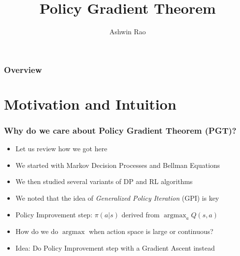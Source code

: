 \documentclass{beamer}
\title[Policy Gradient Theorem]{Policy Gradient Theorem} %
\author{Ashwin Rao} %
\institute[Stanford] %
{ICME, Stanford University
}
\date{} %
\DeclareMathOperator*{\argmax}{argmax}
\begin{document}
\begin{frame}
\titlepage %
\end{frame}

\begin{frame}
\frametitle{Overview} %
\tableofcontents %
\end{frame}

\section{Motivation and Intuition}


\begin{frame}
\frametitle{Why do we care about Policy Gradient Theorem (PGT)?}
\pause
\begin{itemize}[<+->]
\item Let us review how we got here
\item We started with Markov Decision Processes and Bellman Equations
\item We then studied several variants of DP and RL algorithms
\item We noted that the idea of {\em Generalized Policy Iteration} (GPI) is key
\item Policy Improvement step: $\pi(a|s)$ derived from $\argmax_a Q(s, a)$
\item How do we do $\argmax$ when action space is large or continuous?
\item Idea: Do Policy Improvement step with a Gradient Ascent instead
\end{itemize}
\end{frame}
\end{document}
